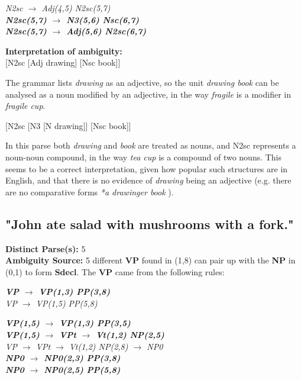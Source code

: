 \documentclass{article}
\begin{document}
\begin{center}
\emph{N2sc $\rightarrow$ Adj(4,5) N2sc(5,7)}\\
\textbf{\emph{N2sc(5,7) $\rightarrow$ N3(5,6) Nsc(6,7)}\\
\emph{N2sc(5,7) $\rightarrow$ Adj(5,6) N2sc(6,7)}}
\end{center}

\textbf{Interpretation of ambiguity:}\\
{[}N2sc {[}Adj drawing{]} {[}Nsc book{]}{]}

The grammar lists \emph{drawing} as an adjective, so the unit \emph{drawing book} can be analysed as a noun modified by an adjective, in the way \emph{fragile} is a modifier in \emph{fragile cup}.

{[}N2sc {[}N3 {[}N drawing{]}{]} {[}Nsc book{]}{]}

In this parse both \emph{drawing} and \emph{book} are treated as nouns, and N2sc represents a noun-noun compound, in the way \emph{tea cup} is a compound of two nouns. This seems to be a correct interpretation, given how popular such structures are in English, and that there is no evidence of \emph{drawing} being an adjective (e.g. there are no comparative forms \emph{*a drawinger book }).

\subsection{"John ate salad with mushrooms with a fork."}

\textbf{Distinct Parse(s):} 5\\

\textbf{Ambiguity Source:} 5 different \textbf{VP} found in (1,8) can pair up with the \textbf{NP} in (0,1) to form \textbf{Sdecl}. The \textbf{VP} came from the following rules:

\begin{center}
	\textbf{\emph{VP $\rightarrow$ VP(1,3) PP(3,8)}}\\
	
	\emph{VP $\rightarrow$ VP(1,5) PP(5,8)}
	
	\textbf{\emph{VP(1,5) $\rightarrow$ VP(1,3) PP(3,5)}\\
	\emph{VP(1,5) $\rightarrow$ VPt $\rightarrow$ Vt(1,2) NP(2,5)}}\\

	\emph{VP $\rightarrow$ VPt $\rightarrow$ Vt(1,2) NP(2,8) $\rightarrow$ NP0}\\
	\textbf{\emph{NP0 $\rightarrow$ NP0(2,3) PP(3,8)}\\
	\emph{NP0 $\rightarrow$ NP0(2,5) PP(5,8)}}
\end{center}
\end{document}
